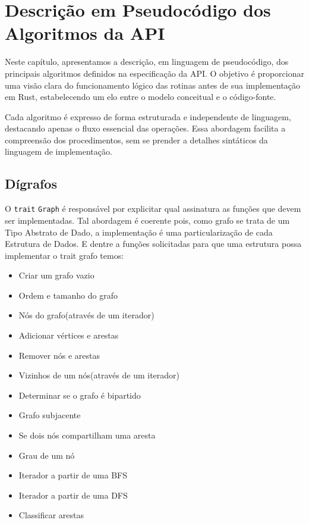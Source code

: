 \chapter{Descrição em Pseudocódigo dos Algoritmos da API}
\label{ch:pseudocode}

Neste capítulo, apresentamos a descrição, em linguagem de pseudocódigo, dos principais algoritmos definidos na especificação da API. O objetivo é proporcionar uma visão clara do funcionamento lógico das rotinas antes de sua implementação em Rust, estabelecendo um elo entre o modelo conceitual e o código-fonte.

Cada algoritmo é expresso de forma estruturada e independente de linguagem, destacando apenas o fluxo essencial das operações. Essa abordagem facilita a compreensão dos procedimentos, sem se prender a detalhes sintáticos da linguagem de implementação.

\section{Dígrafos}
O \texttt{trait} \texttt{Graph} é responsável por explicitar qual assinatura as funções que devem ser implementadas. Tal abordagem é coerente pois, como grafo se trata de um Tipo Abstrato de Dado, a implementação é uma particularização de cada Estrutura de Dados. E dentre a funções solicitadas para que uma estrutura possa implementar o trait grafo temos:

\begin{itemize}
  \item Criar um grafo vazio
  \item Ordem e tamanho do grafo
  \item Nós do grafo(através de um iterador)
  \item Adicionar vértices e arestas
  \item Remover nós e arestas
  \item Vizinhos de um nós(através de um iterador)
  \item Determinar se o grafo é bipartido
  \item Grafo subjacente
  \item Se dois nós compartilham uma aresta
  \item Grau de um nó
  \item Iterador a partir de uma BFS
  \item Iterador a partir de uma DFS
  \item Classificar arestas
\end{itemize}

